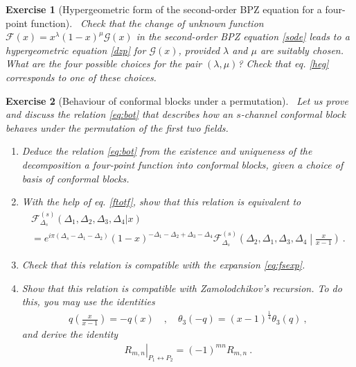 \documentclass[12pt, a4paper, notitlepage, twoside]{report}
\numberwithin{equation}{section}
\theoremstyle{break}
\newtheorem{exo}{Exercise}[chapter]
\begin{document}
\begin{exo}[Hypergeometric form of the second-order BPZ equation for a four-point function]
 ~\label{exohge}
 Check that the change of unknown function $\mathcal{F}(x)=x^{\lambda}(1-x)^{\mu}\mathcal{G}(x)$ in the second-order BPZ equation \eqref{sode} leads to a hypergeometric equation \eqref{dzp} for $\mathcal{G}(x)$, provided $\lambda$ and $\mu$ are suitably chosen.
What are the four possible choices for the pair $(\lambda,\mu)$?
Check that eq. \eqref{heg} corresponds to one of these choices.
\end{exo}


\begin{exo}[Behaviour of conformal blocks under a permutation]
 ~\label{exobot}
Let us prove and discuss the relation \eqref{eq:bot} that describes how an $s$-channel conformal block behaves under the permutation of the first two fields.
\begin{enumerate}
 \item Deduce the relation \eqref{eq:bot} from the existence and uniqueness of the decomposition a four-point function into conformal blocks, given a choice of basis of conformal blocks.
 \item 
 With the help of eq. \eqref{ftotf}, show that this relation is equivalent to 
 \begin{multline}
  \mathcal{F}^{(s)}_{\Delta_s}(\Delta_1,\Delta_2,\Delta_3,\Delta_4|x) 
  \\
  = e^{i\pi(\Delta_s-\Delta_1-\Delta_2)} (1-x)^{-\Delta_1-\Delta_2+\Delta_3-\Delta_4} \mathcal{F}^{(s)}_{\Delta_s}\left(\Delta_2,\Delta_1,\Delta_3,\Delta_4\middle|\tfrac{x}{x-1}\right)\ .
 \end{multline}
 \item Check that this relation is compatible with the expansion \eqref{eq:fsexp}.
 \item Show that this relation is compatible with Zamolodchikov's recursion. To do this, you may use the identities 
 \begin{align}
  q\left(\tfrac{x}{x-1}\right)=-q(x) \quad , \quad \theta_3(-q) = (x-1)^{\frac14}\theta_3(q)\ ,
 \end{align}
 and derive the identity
 \begin{align}
  \left. R_{m,n}\right|_{P_1\leftrightarrow P_2} = (-1)^{mn} R_{m,n}\ .
 \end{align}
\end{enumerate}

\end{exo}
\end{document}
